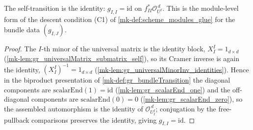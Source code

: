 \begin{lemma}\label{mk-lem:gr_bundleCocycle_id}
  \leanok

  The self-transition is the identity: \(g_{I,I} = \mathrm{id}\) on
  \(f_{II}^{*}\mathcal{O}_{U^I}^{\,d}\). This is the module-level form of the descent
  condition (C1) of \ref{mk-def:scheme_modules_glue} for the bundle data \((g_{I,J})\).
\end{lemma}
\begin{proof}
  The \(I\)-th minor of the universal matrix is the identity block, \(X^I_I = 1_{d\times d}\)
  (\ref{mk-lem:gr_universalMatrix_submatrix_self}), so its Cramer inverse is again the
  identity, \((X^I_I)^{-1} = 1_{d\times d}\) (\ref{mk-lem:gr_universalMinorInv_identities}).
  Hence in the biproduct presentation of \ref{mk-def:gr_bundleTransition} the diagonal
  components are \(\mathrm{scalarEnd}(1) = \mathrm{id}\) (\ref{mk-lem:gr_scalarEnd_one}) and the
  off-diagonal components are \(\mathrm{scalarEnd}(0) = 0\) (\ref{mk-lem:gr_scalarEnd_zero}), so
  the assembled automorphism is the identity of \(\mathcal{O}_{U^I_I}^{\,d}\); conjugation by
  the free-pullback comparisons preserves the identity, giving \(g_{I,I} = \mathrm{id}\).
\end{proof}



